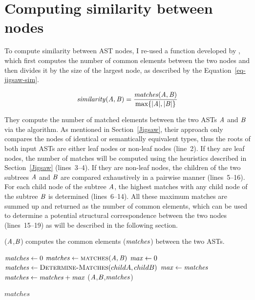 \section{Computing similarity between nodes}  \label{jigsaw-similarity}
To compute similarity between AST nodes, I re-used a function developed by \citet{2008:fse:cottrell}, which first computes the number of common elements between the two nodes and then divides it by the size of the largest node, as described by the Equation~\ref{eq-jigsaw-sim}.


\begin{equation}\label{eq-jigsaw-sim}
\mathit{similarity(\mathit{A},\mathit{B})} = \frac{\mathit{matches}(\mathit{A},\mathit{B})}{\max\{|\mathit{A}|, |\mathit{B}|\}}
\end{equation}


They compute the number of matched elements between the two ASTs $\mathit{A}$ and $\mathit{B}$ via the  algorithm. As mentioned in Section~\ref{Jigsaw}, their approach only compares the nodes of identical or semantically equivalent types, thus the roots of both input ASTs are either leaf nodes or non-leaf nodes (line~2). If they are leaf nodes, the number of matches will be computed using the heuristics described in Section~\ref{Jigsaw} (lines~3--4). If they are  non-leaf nodes, the children of the two subtrees $\mathit{A}$ and $\mathit{B}$ are compared exhaustively in a pairwise manner (lines~5--16). For each child node of the subtree $\mathit{A}$, the highest matches with any child node of the subtree $\mathit{B}$ is determined (lines~6--14). All these maximum matches are summed up and returned as the number of common elements, which can be used to determine a potential structural correspondence between the two nodes (lines~15--19) as will be described in the following section.

\begin{algorithm}
 \caption{($\mathit{A}$,$\mathit{B}$) computes the common elements ($\mathit{matches}$) between the two ASTs.}
  \label{alg:dm}
  \begin{algorithmic}[1]
  \ComputeMatches
  \State $\mathit{matches} \gets 0$
  \State $\mathit{matches} \gets  \textsc{matches}(\mathit{A},\mathit{B})$
		\State $\mathit{max} \gets 0$
			\State $\mathit{matches} \gets  \textsc{Determine-Matches}(childA,childB)$
 		\State $\mathit{max} \gets \mathit{matches}$	
		\EndIf
 \EndFor 	
	  \EndFor 	
	    \State $\mathit{matches} \gets  \mathit{matches} +  \mathit{max}$
 \EndIf
 \State {}($\mathit{A}$,$\mathit{B}$,$\mathit{matches}$)
 		\EndIf 		


 \Return $matches$
\end{algorithmic}
\end{algorithm}



